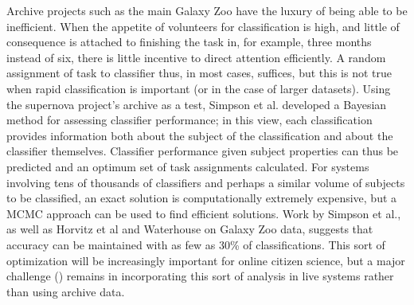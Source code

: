 \documentclass{ar2e}
\begin{document}



Archive projects such as the main Galaxy Zoo have the luxury of being able to be
inefficient.   When the appetite of
volunteers for classification is high, and little of consequence is attached to
finishing the task in, for example, three months instead of six, there is little
incentive to direct attention efficiently. A random assignment of task to
classifier thus, in most cases, suffices, but this is not true when rapid
classification is important (or in the case of larger datasets). Using the
supernova project's archive as a test, Simpson et al. developed a Bayesian
method for assessing classifier performance; in this view, each classification
provides information both about the subject of the classification and about the
classifier themselves. Classifier performance given subject properties can thus
be predicted and an optimum set of task assignments calculated. For systems
involving tens of thousands of classifiers and perhaps a similar volume of
subjects to be classified, an exact solution is computationally extremely
expensive, but a MCMC approach can be used to find efficient solutions. Work by
Simpson et al., as well as Horvitz et al and Waterhouse on Galaxy Zoo data,
suggests that accuracy can be maintained with as few as 30\% of classifications.
This sort of optimization will be increasingly important for online citizen
science, but a major challenge () remains in
incorporating this sort of analysis in live systems rather than using archive
data. 


\end{document}
